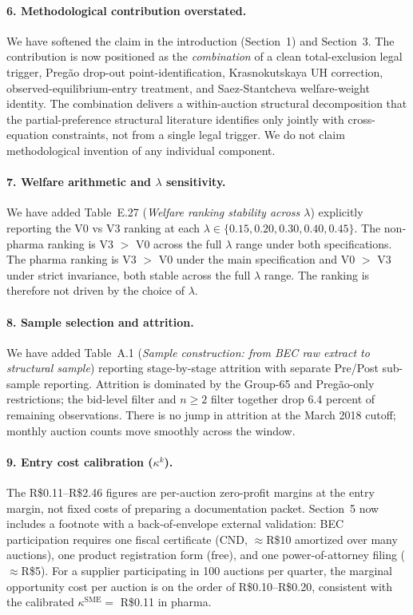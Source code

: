 \documentclass[11pt]{article}
\begin{document}
\paragraph{6. Methodological contribution overstated.}
We have softened the claim in the introduction (Section~1) and Section~3. The contribution is now positioned as the \emph{combination} of a clean total-exclusion legal trigger, Preg\~ao drop-out point-identification, Krasnokutskaya UH correction, observed-equilibrium-entry treatment, and Saez-Stantcheva welfare-weight identity. The combination delivers a within-auction structural decomposition that the partial-preference structural literature identifies only jointly with cross-equation constraints, not from a single legal trigger. We do not claim methodological invention of any individual component.

\paragraph{7. Welfare arithmetic and $\lambda$ sensitivity.}
We have added Table~E.27 (\emph{Welfare ranking stability across $\lambda$}) explicitly reporting the V0 vs V3 ranking at each $\lambda \in \{0.15, 0.20, 0.30, 0.40, 0.45\}$. The non-pharma ranking is V3 $>$ V0 across the full $\lambda$ range under both specifications. The pharma ranking is V3 $>$ V0 under the main specification and V0 $>$ V3 under strict invariance, both stable across the full $\lambda$ range. The ranking is therefore not driven by the choice of $\lambda$.

\paragraph{8. Sample selection and attrition.}
We have added Table~A.1 (\emph{Sample construction: from BEC raw extract to structural sample}) reporting stage-by-stage attrition with separate Pre/Post sub-sample reporting. Attrition is dominated by the Group-65 and Preg\~ao-only restrictions; the bid-level filter and $n \ge 2$ filter together drop 6.4 percent of remaining observations. There is no jump in attrition at the March 2018 cutoff; monthly auction counts move smoothly across the window.

\paragraph{9. Entry cost calibration ($\kappa^k$).}
The R\$0.11--R\$2.46 figures are per-auction zero-profit margins at the entry margin, not fixed costs of preparing a documentation packet. Section~5 now includes a footnote with a back-of-envelope external validation: BEC participation requires one fiscal certificate (CND, $\approx$R\$10 amortized over many auctions), one product registration form (free), and one power-of-attorney filing ($\approx$R\$5). For a supplier participating in 100 auctions per quarter, the marginal opportunity cost per auction is on the order of R\$0.10--R\$0.20, consistent with the calibrated $\kappa^{\text{SME}} =$ R\$0.11 in pharma.
\end{document}
